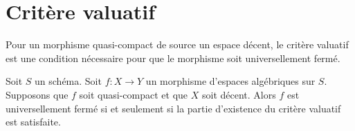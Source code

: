 \section{Critère valuatif}
\label{section-valuative-criterion-universally-closed}

\noindent
Pour un morphisme quasi-compact de source un espace décent, le critère
valuatif est une condition nécessaire pour que le morphisme soit
universellement fermé.


\begin{proposition}
\label{proposition-characterize-universally-closed}
Soit $S$ un schéma. Soit $f : X \to Y$ un morphisme d'espaces algébriques
sur $S$. Supposons que $f$ soit quasi-compact et que $X$ soit décent.
Alors $f$ est
universellement fermé si et seulement si la partie d'existence du critère
valuatif est satisfaite.
\end{proposition}

